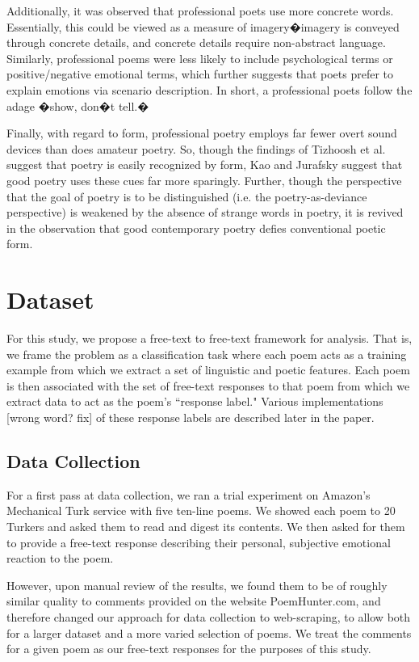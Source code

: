 \documentclass[11pt]{article}
\begin{document}
Additionally, it was observed that professional poets use more concrete words. Essentially, this could be viewed as a measure of imagery�imagery is conveyed through concrete details, and concrete details require non-abstract language. Similarly, professional poems were less likely to include psychological terms or positive/negative emotional terms, which further suggests that poets prefer to explain emotions via scenario description. In short, a professional poets follow the adage �show, don�t tell.�

Finally, with regard to form, professional poetry employs far fewer overt sound devices than does amateur poetry. So, though the findings of Tizhoosh et al. suggest that poetry is easily recognized by form, Kao and Jurafsky suggest that good poetry uses these cues far more sparingly. Further, though the perspective that the goal of poetry is to be distinguished (i.e. the poetry-as-deviance perspective) is weakened by the absence of strange words in poetry, it is revived in the observation that good contemporary poetry defies conventional poetic form.

\section{Dataset}
For this study, we propose a free-text to free-text framework for analysis. That is, we frame the problem as a classification task where each poem acts as a training example from which we extract a set of linguistic and poetic features. Each poem is then associated with the set of free-text responses to that poem from which we extract data to act as the poem's ``response label." Various implementations [wrong word? fix] of these response labels are described later in the paper.

\subsection*{Data Collection}
For a first pass at data collection, we ran a trial experiment on Amazon's Mechanical Turk service with five ten-line poems. We showed each poem to 20 Turkers and asked them to read and digest its contents. We then asked for them to provide a free-text response describing their personal, subjective emotional reaction to the poem. 

However, upon manual review of the results, we found them to be of roughly similar quality to comments provided on the website PoemHunter.com, and therefore changed our approach for data collection to web-scraping, to allow both for a larger dataset and a more varied selection of poems. We treat the comments for a given poem as our free-text responses for the purposes of this study.
\end{document}
